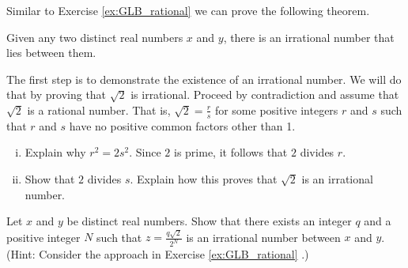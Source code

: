\item \label{ex:GLB_irrational} Similar to Exercise \ref{ex:GLB_rational} we can prove the following theorem.

\begin{theorem} Given any two distinct real numbers $x$ and $y$, there is an irrational number that lies between them.
\end{theorem}

\ba

\item The first step is to demonstrate the existence of an irrational number. We will do that by proving that $\sqrt{2}$ is irrational. Proceed by contradiction and assume that $\sqrt{2}$ is a rational number. That is, $\sqrt{2} = \frac{r}{s}$ for some positive integers $r$ and $s$ such that $r$ and $s$ have no positive common factors other than 1. 

	\begin{enumerate}[i.]
	\item Explain why $r^2=2s^2$. Since $2$ is prime, it follows that $2$ divides $r$. 
	
	\item Show that $2$ divides $s$. Explain how this proves that $\sqrt{2}$ is an irrational number.
	
	\end{enumerate}

\item Let $x$ and $y$ be distinct real numbers. Show that there exists an integer $q$ and a positive integer $N$ such that $z=\frac{q\sqrt{2}}{2^N}$ is an irrational number between $x$ and $y$. (Hint: Consider the approach in Exercise \ref{ex:GLB_rational} .)


\ea

